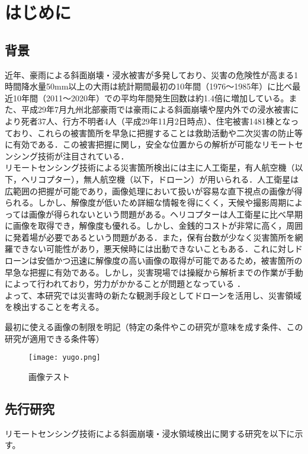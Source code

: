 \documentclass[../Thesis]{subfiles}
\begin{document}
\chapter{はじめに}
\label{cha:はじめに}
\section{背景}
  近年、豪雨による斜面崩壊・浸水被害が多発しており、災害の危険性が高まる1時間降水量50mm以上の大雨は統計期間最初の10年間（1976～1985年）に比べ最近10年間（2011～2020年）での平均年間発生回数は約1.4倍に増加している\cite{web01}。また、平成29年7月九州北部豪雨では豪雨による斜面崩壊や屋内外での浸水被害により死者37人、行方不明者4人（平成29年11月2日時点）、住宅被害1481棟\cite{art01}となっており、これらの被害箇所を早急に把握することは救助活動や二次災害の防止等に有効である．この被害把握に関し，安全な位置からの解析が可能なリモートセンシング技術が注目されている．\\
  \quad リモートセンシング技術による災害箇所検出には主に人工衛星，有人航空機（以下，ヘリコプター），無人航空機（以下，ドローン）が用いられる．人工衛星は広範囲の把握が可能であり，画像処理において扱いが容易な直下視点の画像が得られる。しかし、解像度が低いため詳細な情報を得にくく，天候や撮影周期によっては画像が得られないという問題がある。ヘリコプターは人工衛星に比べ早期に画像を取得でき，解像度も優れる。しかし、金銭的コストが非常に高く，周囲に発着場が必要であるという問題がある．また，保有台数が少なく災害箇所を網羅できない可能性があり，悪天候時には出動できないこともある．これに対しドローンは安価かつ迅速に解像度の高い画像の取得が可能であるため，被害箇所の早急な把握に有効である。しかし，災害現場では操縦から解析までの作業が手動によって行われており，労力がかかることが問題となっている \cite{web02}．\\
  \quad よって、本研究では災害時の新たな観測手段としてドローンを活用し、災害領域を検出することを考える。  


  最初に使える画像の制限を明記（特定の条件やこの研究が意味を成す条件、この研究が適用できる条件等）

  \label{sec:背景}
  \begin{figure}[h]
    \centering
    \texttt{[image: yugo.png]}
    \caption{画像テスト}
    \label{fig:YUGO}
  \end{figure}
  \par


\section{先行研究}
  リモートセンシング技術による斜面崩壊・浸水領域検出に関する研究を以下に示す。
  
\end{document}
